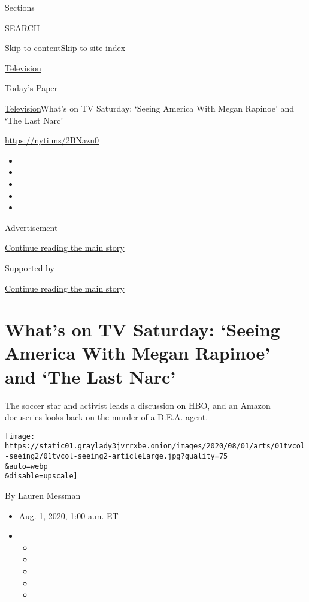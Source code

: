 Sections

SEARCH

\protect\hyperlink{site-content}{Skip to
content}\protect\hyperlink{site-index}{Skip to site index}

\href{https://www.nytimes3xbfgragh.onion/section/arts/television}{Television}

\href{https://myaccount.nytimes3xbfgragh.onion/auth/login?response_type=cookie\&client_id=vi}{}

\href{https://www.nytimes3xbfgragh.onion/section/todayspaper}{Today's
Paper}

\href{/section/arts/television}{Television}\textbar{}What's on TV
Saturday: `Seeing America With Megan Rapinoe' and `The Last Narc'

\url{https://nyti.ms/2BNazn0}

\begin{itemize}
\item
\item
\item
\item
\item
\end{itemize}

Advertisement

\protect\hyperlink{after-top}{Continue reading the main story}

Supported by

\protect\hyperlink{after-sponsor}{Continue reading the main story}

\hypertarget{whats-on-tv-saturday-seeing-america-with-megan-rapinoe-and-the-last-narc}{%
\section{What's on TV Saturday: `Seeing America With Megan Rapinoe' and
`The Last
Narc'}\label{whats-on-tv-saturday-seeing-america-with-megan-rapinoe-and-the-last-narc}}

The soccer star and activist leads a discussion on HBO, and an Amazon
docuseries looks back on the murder of a D.E.A. agent.

\texttt{[image: https://static01.graylady3jvrrxbe.onion/images/2020/08/01/arts/01tvcol-seeing2/01tvcol-seeing2-articleLarge.jpg?quality=75\\\&auto=webp\\\&disable=upscale]}

By Lauren Messman

\begin{itemize}
\item
  Aug. 1, 2020, 1:00 a.m. ET
\item
  \begin{itemize}
  \item
  \item
  \item
  \item
  \item
  \end{itemize}
\end{itemize}

